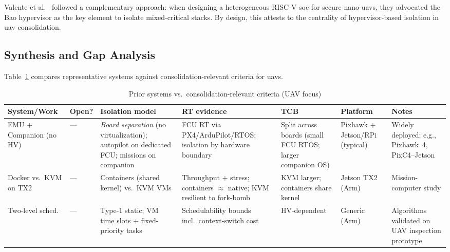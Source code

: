 Valente et al.~\cite{valente_heterogeneous_2024} followed a complementary approach:
when designing a heterogeneous RISC-V \gls{soc} for secure nano-\glspl{uav}, they advocated the Bao hypervisor as the key element
to isolate mixed-critical stacks. By design, this attests to the centrality of
hypervisor-based isolation in \gls{uav} consolidation.

\subsection{Synthesis and Gap Analysis}
\label{subsec:rw-gap}
Table~\ref{tab:rw-compare} compares representative systems against
consolidation-relevant criteria for \glspl{uav}.

\begin{table}[!tbp]
  \centering
  \caption{Prior systems vs.\ consolidation-relevant criteria (UAV focus)}
  \label{tab:rw-compare}
  \begingroup
  \setlength{\tabcolsep}{3.2pt}
  \renewcommand{\arraystretch}{1.10}
  \setlength{\extrarowheight}{0.4ex}
  \scriptsize
  \begin{tabularx}{\textwidth}{@{}%
    >{\raggedright\arraybackslash}p{1.8cm}  %
    >{\centering\arraybackslash}p{0.9cm}    %
    >{\raggedright\arraybackslash}p{3.0cm}  %
    >{\raggedright\arraybackslash}p{3.0cm}  %
    >{\raggedright\arraybackslash}p{2.1cm}  %
    >{\raggedright\arraybackslash}p{1.5cm}  %
    >{\raggedright\arraybackslash}X         %
    @{}}
    \toprule
    \textbf{System/Work} & \textbf{Open?} & \textbf{Isolation model} & \textbf{RT evidence} & \textbf{TCB} & \textbf{Platform} & \textbf{Notes} \\
    \midrule
    FMU + Companion (no HV) & — & \textit{Board separation} (no virtualization); autopilot on dedicated FCU; missions on companion & FCU RT via PX4/ArduPilot/RTOS; isolation by hardware boundary & Split across boards (small FCU RTOS; larger companion OS) & Pixhawk + Jetson/RPi (typical) & Widely deployed; e.g., Pixhawk~4, PixC4–Jetson \cite{pixhawk4,jetson-docs} \\
    \midrule
    Docker vs.\ KVM on TX2 \cite{wang_enabling_2018} & — & Containers (shared kernel) vs.\ KVM VMs & Throughput + stress; containers \(\approx\) native; KVM resilient to fork-bomb & KVM larger; containers share kernel & Jetson TX2 (Arm) & Mission-computer study \\
    Two-level sched.\ \cite{fautrel_hypervisor_2019} & — & Type-1 static; VM time slots + fixed-priority tasks & Schedulability bounds incl.\ context-switch cost & HV-dependent & Generic (Arm) & Algorithms validated on UAV inspection prototype \\

\end{tabularx}
\end{table}
